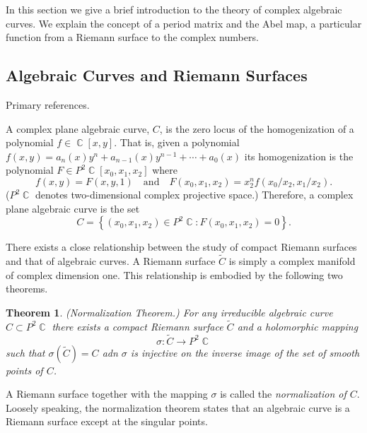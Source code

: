 \documentclass[10pt,twoside]{article}
\newtheorem{theorem}{Theorem}[section]
\numberwithin{equation}{section}
\DeclareMathOperator{\CC}{\mathbb{C}}
\begin{document}
In this section we give a brief introduction to the theory of complex
algebraic curves. We explain the concept of a period matrix and the Abel
map, a particular function from a Riemann surface to the complex
numbers.

\subsection{Algebraic Curves and Riemann Surfaces}

Primary references. \cite{Griffiths89}

A complex plane algebraic curve, $C$, is the zero locus of the
homogenization of a polynomial $f \in \CC[x,y]$. That is, given a
polynomial $f(x,y) = a_n(x) y^n + a_{n-1}(x)y^{n-1} + \cdots + a_0(x)$
its homogenization is the polynomial $F \in P^2\CC[x_0,x_1,x_2]$ where
\[
  f(x,y) = F(x,y,1)
  \quad \text{and} \quad
  F(x_0,x_1,x_2) = x_2^n f(x_0/x_2,x_1/x_2).
\]
($P^2\CC$ denotes two-dimensional complex projective space.) Therefore,
a complex plane algebraic curve is the set
\[
  C = \left\{
  (x_0,x_1,x_2) \in P^2\CC : F(x_0,x_1,x_2) = 0
  \right\}.
\]

There exists a close relationship between the study of compact Riemann
surfaces and that of algebraic curves. A Riemann surface $\tilde{C}$ is
simply a complex manifold of complex dimension one. This relationship is
embodied by the following two theorems.

\begin{theorem} \label{thm: normalization}
  {\it (Normalization Theorem.)} For any irreducible algebraic curve $C
  \subset P^2\CC$ there exists a compact Riemann surface $\tilde{C}$ and
  a holomorphic mapping
  \[
    \sigma : \tilde{C} \to P^2\CC
  \]
  such that $\sigma( \tilde{C} ) = C$ adn $\sigma$ is injective on the
  inverse image of the set of smooth points of $C$.
\end{theorem}

A Riemann surface together with the mapping $\sigma$ is called the {\it
  normalization of $C$}. Loosely speaking, the normalization theorem
states that an algebraic curve is a Riemann surface except at the
singular points.

\end{document}
